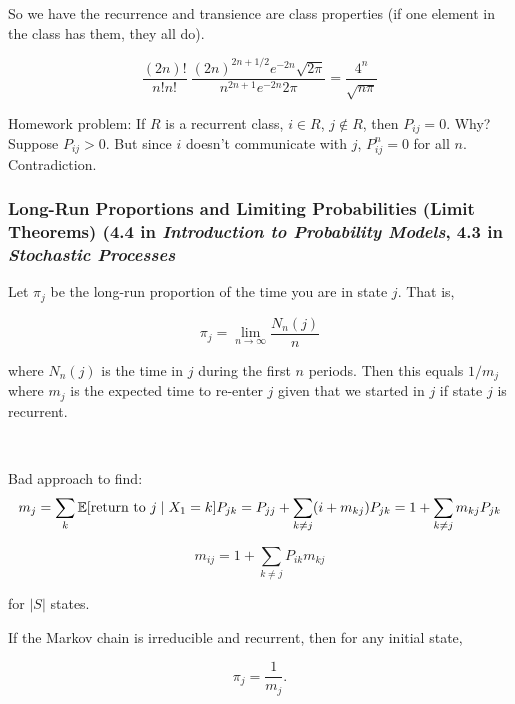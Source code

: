So we have the recurrence and transience are class properties (if one element in the class has them, they all do). 

\begin{example}

\[
\frac{(2n)!}{n!n!} ~ \frac{(2n)^{2n+1/2} e^{-2n} \sqrt{2 \pi}}{n^{2n+1} e^{-2n} 2 \pi} = \frac{4^n}{\sqrt{n \pi}}
\]

\end{example}

Homework problem: If \(R\) is a recurrent class, \(i \in R\), \(j \notin R\), then \(P_{ij}=0\). Why? Suppose \(P_{ij}>0\). But since \(i\) doesn't communicate with \(j\), \(P_{ij}^n=0\) for all \(n\). Contradiction. 

\subsubsection{Long-Run Proportions and Limiting Probabilities (Limit Theorems) (4.4 in \textit{Introduction to Probability Models}, 4.3 in \textit{Stochastic Processes}}

Let \(\pi_j\) be the long-run proportion of the time you are in state \(j\). That is,

\[
\pi_j = \lim_{n \to \infty} \frac{N_n(j)}{n} 
\]

where \(N_n(j)\) is the time in \(j\) during the first \(n\) periods. Then this equals \(1/m_j\) where \(m_j\) is the expected time to re-enter \(j\) given that we started in \(j\) if state \(j\) is recurrent.

\

Bad approach to find:
\[
m_j = \sum_k \E [\text{return to } j \mid X_1 = k] P_{jk} = P_{jj} + \sum_{k \neq j} (i + m_{kj}) P_{jk} = 1 + \sum_{k \neq j} m_{kj} P_{jk}
\]

\[
m_{ij} = 1 + \sum_{k \neq j} P_{ik} m_{kj} 
\]

for \(|S|\) states.

\begin{proposition}

If the Markov chain is irreducible and recurrent, then for any initial state,

\[
\pi_j =\frac{1}{m_j}.
\]

\end{proposition}

\begin{proposition}



\end{proposition}

